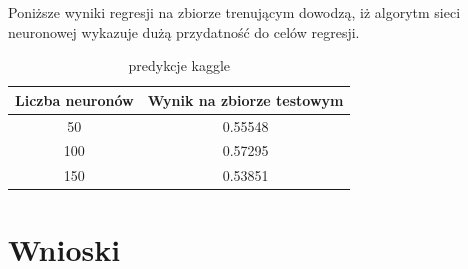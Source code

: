 \documentclass[a4paper,12pt]{article}
\begin{document}
        Poniższe wyniki regresji na zbiorze trenującym dowodzą, iż algorytm sieci neuronowej wykazuje dużą przydatność do celów regresji.
        
        \begin{table}
            \begin{tabular}{|c|c|}
            \hline 
            Liczba neuronów & Wynik na zbiorze testowym \\ 
            \hline 
            50 & 0.55548 \\ 
            \hline 
            100 & 0.57295 \\ 
            \hline 
            150 & 0.53851 \\ 
            \hline 
            \end{tabular} 
            \caption{predykcje kaggle}
        \end{table}    
    

\section{Wnioski}
 
\end{document}
